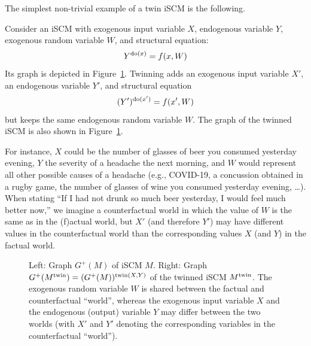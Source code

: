 The simplest non-trivial example of a twin iSCM is the following.
\begin{Eg}
  Consider an iSCM with exogenous input variable $X$, endogenous variable $Y$, exogenous random variable $W$, and
  structural equation:
  $$Y^{\operatorname{do}(x)} = f(x,W)$$
  Its graph is depicted in Figure~\ref{fig:twin_iSCM}.
  Twinning adds an exogenous input variable $X'$, an endogenous variable $Y'$, and structural equation
  $$(Y')^{\operatorname{do}(x')} = f(x',W)$$
  but keeps the same endogenous random variable $W$.
  The graph of the twinned iSCM is also shown in Figure~\ref{fig:twin_iSCM}.

  For instance, $X$ could be the number of glasses of beer you consumed yesterday evening,
  $Y$ the severity of a headache the next morning, and $W$ would represent all other possible
  causes of a headache (e.g., COVID-19, a concussion obtained in a rugby game, the number of
  glasses of wine you consumed yesterday evening, \dots). When stating 
  ``If I had not drunk so much beer yesterday, I would feel much better now,''
  we imagine a counterfactual world in which the value of $W$ is the same as in the
  (f)actual world, but $X'$ (and therefore $Y'$) may have different values in the
  counterfactual world than the corresponding values $X$ (and $Y$) in the factual world.
  \begin{figure}\centering
    \caption{Left: Graph $G^+(M)$ of iSCM $M$. Right: Graph $G^+(M^{\mathrm{twin}}) = (G^+(M))^{\mathrm{twin}(X,Y)}$ of the twinned iSCM $M^{\mathrm{twin}}$.
    The exogenous random variable $W$ is shared between the factual and counterfactual ``world'', whereas the exogenous
    input variable $X$ and the endogenous (output) variable $Y$ may differ between the two worlds (with $X'$ and $Y'$ denoting the corresponding variables in the counterfactual ``world'').\label{fig:twin_iSCM}}
\end{figure}
\end{Eg}

